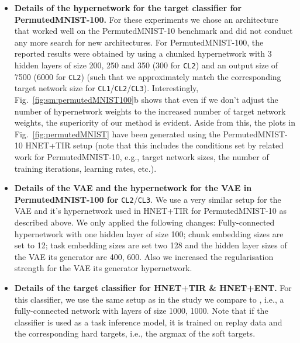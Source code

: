 \documentclass{article}
\begin{document}
\begin{itemize}
     \item \textbf{Details of the hypernetwork for the target classifier for PermutedMNIST-100.} 
      For these experiments we chose an architecture that worked well on the PermutedMNIST-10 benchmark and did not conduct any more search for new architectures.
      For PermutedMNIST-100, the reported results were obtained by using a chunked hypernetwork with 3 hidden layers of size 200, 250 and 350 (300 for \texttt{CL2}) and an output size of 7500 (6000 for \texttt{CL2}) (such that we approximately match the corresponding target network size for \texttt{CL1}/\texttt{CL2}/\texttt{CL3}). Interestingly, Fig.~\ref{fig:sm:permutedMNIST100}b shows that even if we don't adjust the number of hypernetwork weights to the increased number of target network weights, the superiority of our method is evident. Aside from this, the plots in Fig.~\ref{fig:permutedMNIST} have been generated using the PermutedMNIST-10 HNET+TIR setup (note that this includes the conditions set by related work for PermutedMNIST-10, e.g., target network sizes, the number of training iterations, learning rates, etc.).
      
\item \textbf{Details of the VAE and the hypernetwork for the VAE in PermutedMNIST-100 for } \texttt{CL2}/\texttt{CL3}.
    We use a very similar setup for the VAE and it's hypernetwork used in HNET+TIR for PermutedMNIST-10 as described above. We only applied the following changes: Fully-connected hypernetwork with one hidden layer of size 100; chunk embedding sizes are set to 12; task embedding sizes are set two 128 and the hidden layer sizes of the VAE its generator are 400, 600. Also we increased the regularisation strength  for the VAE its generator hypernetwork.
    
     \item \textbf{Details of the target classifier for HNET+TIR \& HNET+ENT.}
     For this classifier, we use the same setup as in the study we compare to \citep{van_de_ven_three_2019}, i.e., a fully-connected network with layers of size 1000, 1000.
     Note that if the classifier is used as a task inference model, it is trained on replay data and the corresponding hard targets, i.e., the argmax of the soft targets.
\end{itemize}
\end{document}
